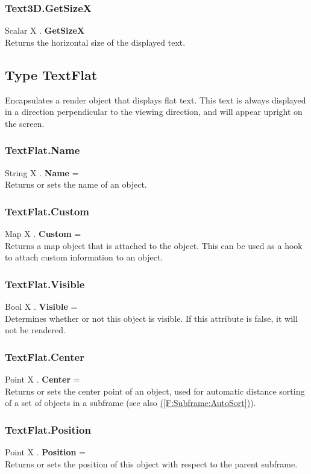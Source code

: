 \documentclass[10pt]{book}
\newcommand{\linkitem}[1]{\hyperref[#1]{\nameref{#1} (\ref{#1})}}
\begin{document}
\subsubsection{Text3D.GetSizeX \label{F:Text3D:GetSizeX}}
Scalar X . \textbf{GetSizeX} \\
Returns the horizontal size of the displayed text.

\subsection{Type TextFlat \label{T:TextFlat}}
Encapsulates a render object that displays flat text. This text is always displayed in a direction perpendicular to the viewing direction, and will appear upright on the screen.

\subsubsection{TextFlat.Name \label{F:TextFlat:Name}}
String X . \textbf{Name} = \\
Returns or sets the name of an object.

\subsubsection{TextFlat.Custom \label{F:TextFlat:Custom}}
Map X . \textbf{Custom} = \\
Returns a map object that is attached to the object. This can be used as a hook to attach custom information to an object.


\subsubsection{TextFlat.Visible \label{F:TextFlat:Visible}}
Bool X . \textbf{Visible} = \\
Determines whether or not this object is visible. If this attribute is false, it will not be rendered.

\subsubsection{TextFlat.Center \label{F:TextFlat:Center}}
Point X . \textbf{Center} = \\
Returns or sets the center point of an object, used for automatic distance sorting of a set of objects in a subframe (see also \linkitem{F:Subframe:AutoSort}).

\subsubsection{TextFlat.Position \label{F:TextFlat:Position}}
Point X . \textbf{Position} = \\
Returns or sets the position of this object with respect to the parent subframe.
\end{document}
